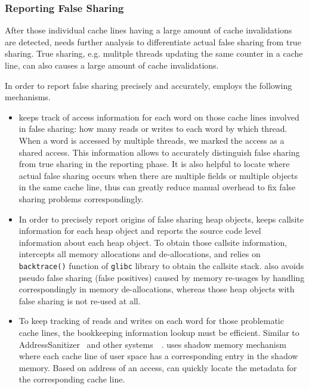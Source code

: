 \subsubsection{Reporting False Sharing}
After those individual cache lines having a large amount of cache
invalidations are detected,
\Predator{} needs further analysis to differentiate actual false sharing from true sharing. 
True sharing, e.g. mulitple threads updating 
the same counter in a cache line, can also causes a large amount of cache invalidations.

In order to report false sharing precisely and accurately,  
\Predator{} employs the following mechanisms. 
\begin{itemize}
\item
\Predator{} keeps track of access information for each word on those
cache lines involved in false sharing: 
how many reads or writes to each word by which thread. 
When a word is accessed by multiple threads,
we marked the access as a shared access. This information 
allows \Predator{} to accurately distinguish false sharing from true sharing 
in the reporting phase.
It is also helpful to locate where 
actual false sharing occurs when there are multiple fields or multiple objects 
in the same cache line, thus can greatly reduce manual overhead to fix false sharing problems
correspondingly. 

\item
In order to precisely report origins of false sharing heap objects, \Predator{}
keeps callsite information for each heap object and reports the source code level
information about each heap object. To obtain those callsite information, \Predator{}
intercepts all memory allocations and de-allocations, and relies on \texttt{backtrace()} 
function of \texttt{glibc} library to obtain the callsite stack. 
\Predator{} also avoids pseudo false sharing (false positives) caused by memory re-usages 
by handling correspondingly in memory de-allocations, whereas those heap objects with false 
sharing is not re-used at all.

\item
To keep tracking of reads and writes on each word for those problematic cache lines,
the bookkeeping information lookup must be efficient.
Similar to 
AddressSanitizer~\cite{Addresssanitizer} and other systems~\cite{qinzhaodetection}~\cite{Valgrind}. 
\Predator{} uses shadow memory mechanism 
where each cache line of user space has a corresponding entry in the shadow memory. 
Based on address of an access, \Predator{} can quickly locate
the metadata for the corresponding cache line.


\end{itemize}
